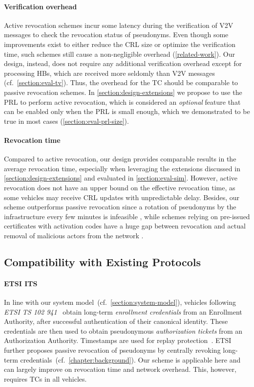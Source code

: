 \paragraph{Verification overhead}
%
Active revocation schemes incur some latency during the verification of \ac{V2V}
messages to check the revocation status of pseudonyms. Even though some
improvements exist to either reduce the \ac{CRL} size or optimize the
verification time, such schemes still cause a non-negligible overhead
(\cref{related-work}). Our design, instead, does not require any additional
verification overhead except for processing \acp{HB}, which are received more
seldomly than \ac{V2V} messages (cf.~\cref{section:eval-tv}). Thus, the overhead
for the \ac{TC} should be comparable to passive revocation schemes. %
In
\cref{section:design-extensions} we propose to use the \ac{PRL} to perform
active revocation, which is considered an \emph{optional} feature that can be
enabled only when the \ac{PRL} is small enough, which we demonstrated to be true
in most cases (\cref{section:eval-prl-size}).

\paragraph{Revocation time}
%
Compared to active revocation, our design provides comparable results in the
average revocation time, especially when leveraging the extensions discussed in
\cref{section:design-extensions} and evaluated in \cref{section:eval-sim}.
However, active revocation does not have an upper bound on the effective
revocation time, as some vehicles may receive \ac{CRL} updates with
unpredictable delay. Besides, our scheme outperforms passive revocation since a
rotation of pseudonyms by the infrastructure every few minutes is infeasible
\cite{hicks2020vehicular}, while schemes relying on pre-issued certificates with
activation codes have a huge gap between revocation and actual removal of
malicious actors from the network \cite{verheul2019ifal,simplicio2019acpc}.

\subsection{Compatibility with Existing Protocols}
\label{section:discussion-compatibility}

\paragraph{ETSI ITS}
%
In line with our system model~(cf.~\cref{section:system-model}), vehicles
following \emph{ETSI TS 102 941}~\cite{etsi2022102941} obtain long-term
\emph{enrollment credentials} from an Enrollment Authority, after successful
authentication of their canonical identity. These credentials are then used to
obtain pseudonymous \emph{authorization tickets} from an Authorization
Authority. Timestamps are used for replay protection~\cite{etsi2021102940}.
ETSI~\cite{etsi2022102941} further proposes passive revocation of pseudonyms by
centrally revoking long-term credentials~(cf.~\cref{chapter:background}). Our
scheme is applicable here and can largely improve on revocation time and network
overhead. This, however, requires \acp{TC} in all vehicles.

